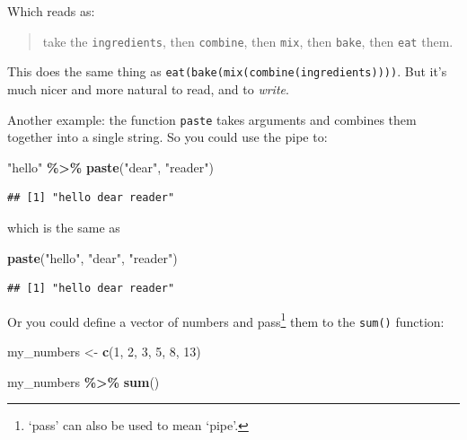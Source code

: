 \documentclass[
]{book}
\newenvironment{Shaded}{\begin{snugshade}}{\end{snugshade}}
\newcommand{\DecValTok}[1]{\textcolor[rgb]{0.00,0.00,0.81}{#1}}
\newcommand{\KeywordTok}[1]{\textcolor[rgb]{0.13,0.29,0.53}{\textbf{#1}}}
\newcommand{\NormalTok}[1]{#1}
\newcommand{\OperatorTok}[1]{\textcolor[rgb]{0.81,0.36,0.00}{\textbf{#1}}}
\newcommand{\StringTok}[1]{\textcolor[rgb]{0.31,0.60,0.02}{#1}}
\begin{document}
Which reads as:

\begin{quote}
take the \texttt{ingredients}, then \texttt{combine}, then \texttt{mix}, then \texttt{bake}, then \texttt{eat} them.
\end{quote}

This does the same thing as \texttt{eat(bake(mix(combine(ingredients))))}. But it's much nicer and more natural to read, and to \emph{write}.

Another example: the function \texttt{paste} takes arguments and combines them together into a single string. So you could use the pipe to:

\begin{Shaded}
\begin{Highlighting}[]
\StringTok{"hello"} \OperatorTok{\%\textgreater{}\%}\StringTok{ }\KeywordTok{paste}\NormalTok{(}\StringTok{"dear"}\NormalTok{, }\StringTok{"reader"}\NormalTok{)}
\end{Highlighting}
\end{Shaded}

\begin{verbatim}
## [1] "hello dear reader"
\end{verbatim}

which is the same as

\begin{Shaded}
\begin{Highlighting}[]
\KeywordTok{paste}\NormalTok{(}\StringTok{"hello"}\NormalTok{, }\StringTok{"dear"}\NormalTok{, }\StringTok{"reader"}\NormalTok{)}
\end{Highlighting}
\end{Shaded}

\begin{verbatim}
## [1] "hello dear reader"
\end{verbatim}

Or you could define a vector of numbers and pass\footnote{`pass' can also be used to mean `pipe'.} them to the \texttt{sum()} function:

\begin{Shaded}
\begin{Highlighting}[]
\NormalTok{my\_numbers \textless{}{-}}\StringTok{ }\KeywordTok{c}\NormalTok{(}\DecValTok{1}\NormalTok{, }\DecValTok{2}\NormalTok{, }\DecValTok{3}\NormalTok{, }\DecValTok{5}\NormalTok{, }\DecValTok{8}\NormalTok{, }\DecValTok{13}\NormalTok{)}

\NormalTok{my\_numbers }\OperatorTok{\%\textgreater{}\%}\StringTok{ }\KeywordTok{sum}\NormalTok{()}
\end{Highlighting}
\end{Shaded}
\end{document}
